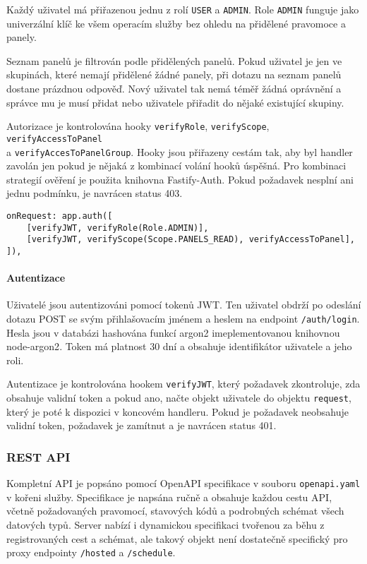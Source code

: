 Každý uživatel má přiřazenou jednu z rolí \lstinline|USER| a \lstinline|ADMIN|. Role \lstinline|ADMIN| funguje jako univerzální klíč ke všem operacím služby bez ohledu na přidělené pravomoce a panely.

Seznam panelů je filtrován podle přidělených panelů. Pokud uživatel je jen ve skupinách, které nemají přidělené žádné panely, při dotazu na seznam panelů dostane prázdnou odpověď. Nový uživatel tak nemá téměř žádná oprávnění a správce mu je musí přidat nebo uživatele přiřadit do nějaké existující skupiny.

Autorizace je kontrolována hooky \lstinline|verifyRole|, \lstinline|verifyScope|, \lstinline|verifyAccessToPanel| \\a \lstinline|verifyAccesToPanelGroup|. Hooky jsou přiřazeny cestám tak, aby byl handler zavolán jen pokud je nějaká z kombinací volání hooků úspěšná. Pro kombinaci strategií ověření je použita knihovna Fastify-Auth\cite{FastifyFastifyauth2024}. Pokud požadavek nesplní ani jednu podmínku, je navrácen status 403.

\begin{lstlisting}[label=src:fastify-auth-hook,caption={Ověření, že požadavek GET /panels/\{panel\_id\} patří uživateli s rolí ADMIN nebo že má přístup k požadovanému panelu}]
onRequest: app.auth([
    [verifyJWT, verifyRole(Role.ADMIN)],
    [verifyJWT, verifyScope(Scope.PANELS_READ), verifyAccessToPanel],
]),
\end{lstlisting}

\paragraph{Autentizace}
Uživatelé jsou autentizováni pomocí tokenů JWT. Ten uživatel obdrží po odeslání dotazu POST se svým přihlašovacím jménem a heslem na endpoint \lstinline|/auth/login|. Hesla jsou v databázi hashována funkcí argon2 imeplementovanou knihovnou node-argon2\cite{althoffRanisaltNodeargon22024}. Token má platnost 30 dní a obsahuje identifikátor uživatele a jeho roli.

Autentizace je kontrolována hookem \lstinline|verifyJWT|, který požadavek zkontroluje, zda obsahuje validní token a pokud ano, načte objekt uživatele do objektu \lstinline|request|, který je poté k dispozici v koncovém handleru. Pokud je požadavek neobsahuje validní token, požadavek je zamítnut a je navrácen status 401.

\subsubsection{REST API}
Kompletní API je popsáno pomocí OpenAPI specifikace v souboru \lstinline|openapi.yaml| v kořeni služby. Specifikace je napsána ručně a obsahuje každou cestu API, včetně požadovaných pravomocí, stavových kódů a podrobných schémat všech datových typů. Server nabízí i dynamickou specifikaci tvořenou za běhu z registrovaných cest a schémat, ale takový objekt není dostatečně specifický pro proxy endpointy \lstinline|/hosted| a \lstinline|/schedule|. 

